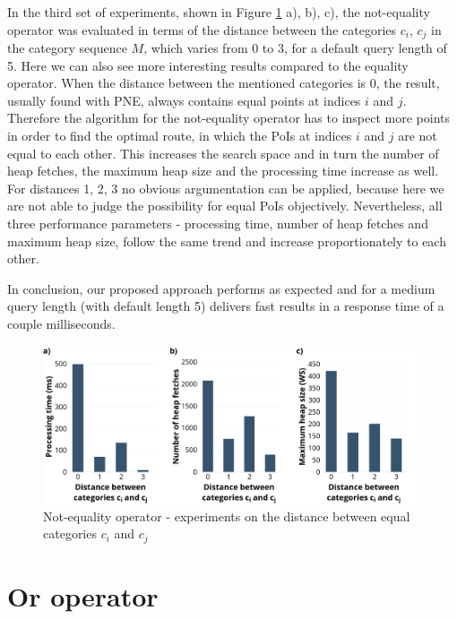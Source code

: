 In the third set of experiments, shown in Figure \ref{fig:neo_distance} a), b), c), the not-equality operator was evaluated in terms of the  distance between the categories $c_i$, $c_j$ in the category sequence $M$, which varies from 0 to 3, for a default query length of 5.  
Here we can also see more interesting results compared to the equality operator. When the distance between the mentioned categories is 0, the result, usually found with PNE, always contains equal points at indices $i$ and $j$. Therefore the algorithm for the not-equality operator has to inspect more points in order to find the optimal route, in which the PoIs at indices $i$ and $j$ are not equal to each other. This increases the search space and in turn the number of heap fetches, the maximum heap size and the processing time increase as well. For distances 1, 2, 3 no obvious argumentation can be applied, because here we are not able to judge the possibility for equal PoIs objectively.
Nevertheless, all three performance parameters - processing time, number of heap fetches and maximum heap size, follow the same trend and increase proportionately to each other.

In conclusion, our proposed approach performs as expected and for a medium query length (with default length 5) delivers fast results in a response time of a couple milliseconds.

\begin{figure}[H]
	\includegraphics[scale=0.33]{images/neo_distance.png}
	\centering
	\caption{Not-equality operator - experiments on the distance between equal categories $c_i$ and $c_j$}
	\label{fig:neo_distance}
\end{figure}


\section{Or operator}
\label{sec:experimentsOr}

